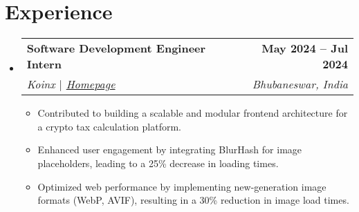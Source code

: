 \documentclass[letterpaper,11pt]{article}
\makeatletter
\newcommand{\resumeItem}[1]{
  \item\small{
    {#1 \vspace{-2pt}}
  }
}
\newcommand{\resumeSubheading}[4]{
  \vspace{-2pt}\item
    \begin{tabular*}{1.0\textwidth}[t]{l@{\extracolsep{\fill}}r}
      \textbf{#1} & \textbf{\small #2} \\
      \textit{\small#3} & \textit{\small #4} \\
    \end{tabular*}\vspace{-7pt}
}
\newcommand{\resumeSubHeadingListStart}{\begin{itemize}[leftmargin=0.0in, label={}]}
\newcommand{\resumeSubHeadingListEnd}{\end{itemize}}
\newcommand{\resumeItemListStart}{\begin{itemize}}
\newcommand{\resumeItemListEnd}{\end{itemize}\vspace{-5pt}}
\makeatother
\begin{document}


\section{Experience}
  \resumeSubHeadingListStart

    \resumeSubheading
      {Software Development Engineer Intern}{May 2024 -- Jul 2024}
      {Koinx $|$ \textcolor{OliveGreen}{\href{https://www.koinx.com/in}{Homepage}}}{Bhubaneswar, India}
      \resumeItemListStart
        \resumeItem{Contributed to building a scalable and modular frontend architecture for a crypto tax calculation platform.}
        \resumeItem{Enhanced user engagement by integrating BlurHash for image placeholders, leading to a 25\% decrease in loading times.}
        \resumeItem{Optimized web performance by implementing new-generation image formats (WebP, AVIF), resulting in a 30\% reduction in image load times.}
      \resumeItemListEnd 
  
  \resumeSubHeadingListEnd
\vspace{-16pt}
\end{document}
